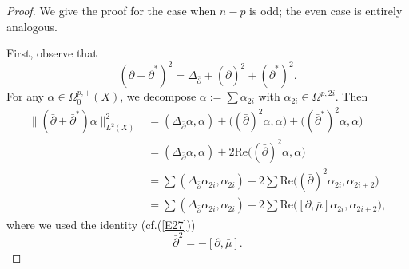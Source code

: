 \documentclass[10pt,a4paper]{amsart}
\def \De {\Delta}
\def\Om{\Omega}
\def \a {\alpha }
\def\pa{\partial}
\begin{document}
\begin{proof}
	We give the proof for the case when $n-p$ is odd; the even case is entirely analogous. 
	
	First, observe that
	\[({\bar{\partial}+\bar{\partial}^{\ast}})^{2}=\De_{\bar{\pa}}+(\bar{\pa})^{2}+(\bar{\pa}^{\ast})^{2}. \]
	For any $\a\in\Om_{0}^{p,+}(X)$, we decompose  $\a:=\sum\a_{2i}$ with $\a_{2i}\in\Om^{p,2i}$. Then
	\begin{equation*}
	\begin{split}
	\|({\bar{\partial}+\bar{\partial}^{\ast}})\a\|_{L^{2}(X)}^{2}
	&=(\De_{\bar{\pa}}\a,\a)+\Big((\bar{\pa})^{2}\a,\a\Big)+\Big((\bar{\pa}^{\ast})^2\a,\a\Big)\\
	&=(\De_{\bar{\pa}}\a,\a)+2\mathrm{Re}\Big((\bar{\pa})^{2}\a,\a\Big)\\
	&=\sum(\De_{\bar{\pa}}\a_{2i},\a_{2i})+2\sum\mathrm{Re}\Big((\bar{\pa})^{2}\a_{2i},\a_{2i+2}\Big)\\
	&=\sum(\De_{\bar{\pa}}\a_{2i},\a_{2i})-2\sum\mathrm{Re}\Big([\pa,\bar{\mu}]\a_{2i},\a_{2i+2}\Big),
	\end{split}
	\end{equation*}
	where we used the identity (cf.(\ref{E27}))
	\[ \bar{\pa}^{2}=-[\pa,\bar{\mu}].\]
	

\end{proof}
\end{document}
